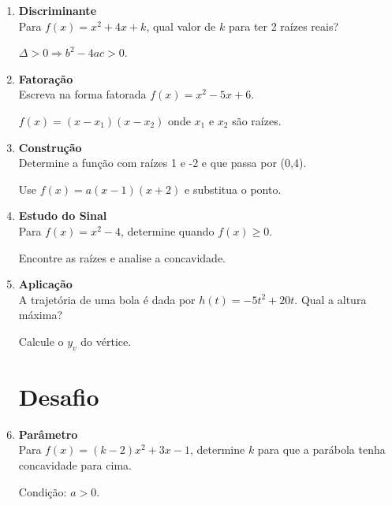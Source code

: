 \documentclass[11pt]{article}
\begin{document}
\begin{multicols}{2}
\begin{enumerate}
\item \textbf{Discriminante}\\
Para $f(x) = x^2 + 4x + k$, qual valor de $k$ para ter 2 raízes reais?
\begin{tcolorbox}[colback=explanationbg,colframe=titleblue,title=Dica:]
$\Delta > 0 \Rightarrow b^2 - 4ac > 0$.
\end{tcolorbox}

\item \textbf{Fatoração}\\
Escreva na forma fatorada $f(x) = x^2 - 5x + 6$.
\begin{tcolorbox}[colback=explanationbg,colframe=titleblue,title=Dica:]
$f(x) = (x - x_1)(x - x_2)$ onde $x_1$ e $x_2$ são raízes.
\end{tcolorbox}

\item \textbf{Construção}\\
Determine a função com raízes 1 e -2 e que passa por (0,4).
\begin{tcolorbox}[colback=explanationbg,colframe=titleblue,title=Dica:]
Use $f(x) = a(x-1)(x+2)$ e substitua o ponto.
\end{tcolorbox}

\item \textbf{Estudo do Sinal}\\
Para $f(x) = x^2 - 4$, determine quando $f(x) \geq 0$.
\begin{tcolorbox}[colback=explanationbg,colframe=titleblue,title=Dica:]
Encontre as raízes e analise a concavidade.
\end{tcolorbox}

\item \textbf{Aplicação}\\
A trajetória de uma bola é dada por $h(t) = -5t^2 + 20t$. Qual a altura máxima?
\begin{tcolorbox}[colback=explanationbg,colframe=titleblue,title=Dica:]
Calcule o $y_v$ do vértice.
\end{tcolorbox}

\section*{Desafio}

\item \textbf{Parâmetro}\\
Para $f(x) = (k-2)x^2 + 3x - 1$, determine $k$ para que a parábola tenha concavidade para cima.
\begin{tcolorbox}[colback=explanationbg,colframe=titleblue,title=Dica:]
Condição: $a > 0$.
\end{tcolorbox}

\end{enumerate}
\end{multicols}
\end{document}
